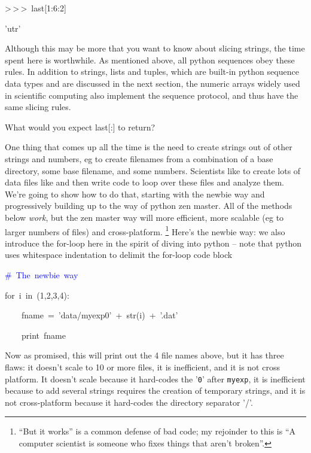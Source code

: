 \begin{lyxcode}
>\,{}>\,{}>~last{[}1:6:2]

'utr'
\end{lyxcode}
Although this may be more that you want to know about slicing strings,
the time spent here is worthwhile. As mentioned above, all python
sequences obey these rules. In addition to strings, lists and tuples,
which are built-in python sequence data types and are discussed in
the next section, the numeric arrays widely used in scientific computing
also implement the sequence protocol, and thus have the same slicing
rules.

\begin{xca}
What would you expect last{[}:] to return?
\end{xca}
One thing that comes up all the time is the need to create strings
out of other strings and numbers, eg to create filenames from a combination
of a base directory, some base filename, and some numbers. Scientists
like to create lots of data files like and then write code to loop
over these files and analyze them. We're going to show how to do that,
starting with the newbie way and progressively building up to the
way of python zen master. All of the methods below \textit{work},
but the zen master way will more efficient, more scalable (eg to larger
numbers of files) and cross-platform.%
\footnote{{}``But it works'' is a common defense of bad code; my rejoinder
to this is {}``A computer scientist is someone who fixes things that
aren't broken''. %
} Here's the newbie way: we also introduce the for-loop here in the
spirit of diving into python -- note that python uses whitespace indentation
to delimit the for-loop code block

\begin{lyxcode}
\textcolor{blue}{\#~The~newbie~way}

for~i~in~(1,2,3,4):

~~~~fname~=~'data/myexp0'~+~str(i)~+~'.dat'

~~~~print~fname
\end{lyxcode}
Now as promised, this will print out the 4 file names above, but it
has three flaws: it doesn't scale to 10 or more files, it is inefficient,
and it is not cross platform. It doesn't scale because it hard-codes
the '\texttt{0}' after \texttt{myexp}, it is inefficient because to
add several strings requires the creation of temporary strings, and
it is not cross-platform because it hard-codes the directory separator
'/'.

